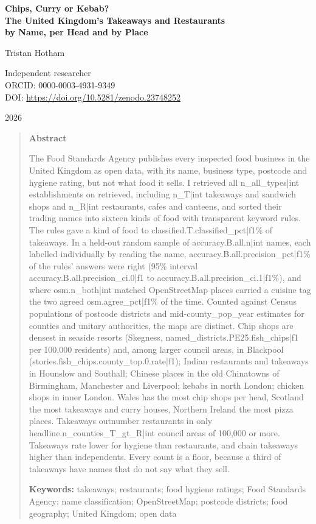 \documentclass[11pt,a4paper]{article}
\begin{document}
\begin{center}
{\Large\bfseries Chips, Curry or Kebab?\\[2pt] The United Kingdom's Takeaways and Restaurants\\[2pt] by Name, per Head and by Place\par}
\vspace{1.2em}
{\large Tristan Hotham\par}
\vspace{0.3em}
{\small Independent researcher\\
ORCID: 0000-0003-4931-9349\\
DOI: \href{https://doi.org/10.5281/zenodo.23748252}{https://doi.org/10.5281/zenodo.23748252}\par}
\vspace{0.8em}
2026
\end{center}

\begin{quote}
\small
\begin{center}\textbf{Abstract}\end{center}
The Food Standards Agency publishes every inspected food business in the United Kingdom as open data, with its name, business type, postcode and hygiene rating, but not what food it sells. I retrieved all {{n_all_types|int}} establishments on {{retrieved}}, including {{n_T|int}} takeaways and sandwich shops and {{n_R|int}} restaurants, cafes and canteens, and sorted their trading names into sixteen kinds of food with transparent keyword rules. The rules gave a kind of food to {{classified.T.classified_pct|f1}}\% of takeaways. In a held-out random sample of {{accuracy.B.all.n|int}} names, each labelled individually by reading the name, {{accuracy.B.all.precision_pct|f1}}\% of the rules' answers were right (95\% interval {{accuracy.B.all.precision_ci.0|f1}} to {{accuracy.B.all.precision_ci.1|f1}}\%), and where {{osm.n_both|int}} matched OpenStreetMap places carried a cuisine tag the two agreed {{osm.agree_pct|f1}}\% of the time. Counted against Census populations of postcode districts and mid-{{county_pop_year}} estimates for counties and unitary authorities, the maps are distinct. Chip shops are densest in seaside resorts (Skegness, {{named_districts.PE25.fish_chips|f1}} per 100,000 residents) and, among larger council areas, in Blackpool ({{stories.fish_chips.county_top.0.rate|f1}}); Indian restaurants and takeaways in Hounslow and Southall; Chinese places in the old Chinatowns of Birmingham, Manchester and Liverpool; kebabs in north London; chicken shops in inner London. Wales has the most chip shops per head, Scotland the most takeaways and curry houses, Northern Ireland the most pizza places. Takeaways outnumber restaurants in only {{headline.n_counties_T_gt_R|int}} council areas of 100,000 or more. Takeaways rate lower for hygiene than restaurants, and chain takeaways higher than independents. Every count is a floor, because a third of takeaways have names that do not say what they sell.

\textbf{Keywords:} takeaways; restaurants; food hygiene ratings; Food Standards Agency; name classification; OpenStreetMap; postcode districts; food geography; United Kingdom; open data
\end{quote}
\end{document}
